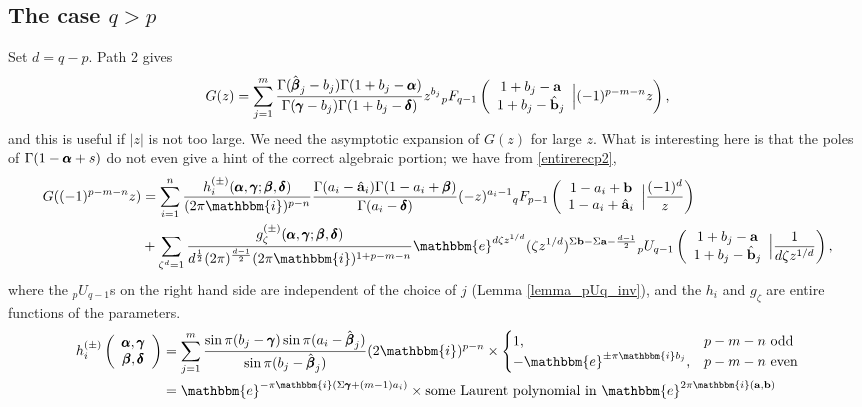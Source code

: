 \documentclass[12pt]{article}
\newcommand{\ee}[0] {\mathbbm{e}}
\newcommand{\ii}[0] {\mathbbm{i}}
\numberwithin{equation}{section}
\newcommand{\FF}[6] {{}_{#1}{#2}_{#3} \left( \begin{array}{c} #4 \\ #5 \end{array} \Big| {#6}  \right)}
\newcommand{\bfa}[0] {\mathbf{a}}
\newcommand{\bfb}[0] {\mathbf{b}}
\begin{document}
\subsection{The case $q>p$}
Set $d = q-p$. Path 2 gives
\begin{equation}
\label{eq_Gpath2}
G(z) = \sum_{j=1}^{m} \frac{\Gamma(\hat{\bfbeta}_j - b_j)\Gamma(1+b_j-\bfalpha)}{\Gamma(\bfgamma-b_j)\Gamma(1+b_j-\bfdelta)} z^{b_j}\FF{p}{F}{q-1}{1+b_j-\bfa}{1+b_j-\hat{\bfb}_j}{(-1)^{p-m-n}z}\text{,}
\end{equation}
and this is useful if $|z|$ is not too large. We need the asymptotic expansion of $G(z)$ for large $z$. What is interesting here is that the poles of $\Gamma(1-\pmb{\alpha}+s)$ do not even give a hint of the correct algebraic portion; we have from \eqref{entirerecp2},
\begin{align*}
G((-1)^{p-m-n}z) &= \sum_{i=1}^{n} \frac{h_{i}^{(\pm)}(\bfalpha, \bfgamma; \bfbeta, \bfdelta)}{(2\pi \ii)^{p-n} } \frac{\Gamma(a_i-\hat{\bfa}_i)\Gamma(1-a_i+\bfbeta)}{\Gamma(a_i-\bfdelta)} (-z)^{a_i-1}\FF{q}{F}{p-1}{1-a_i+\bfb}{1-a_i+\hat{\bfa}_i}{\frac{(-1)^{d}}{z}}\\
&+\sum_{\zeta^d=1} \frac{g_{\zeta}^{(\pm)}(\bfalpha, \bfgamma; \bfbeta, \bfdelta)}{d^{\frac{1}{2}} (2\pi)^{\frac{d-1}{2}} (2\pi \ii)^{1+p-m-n}} \ee^{d \zeta z^{1/d}}(\zeta z^{1/d})^{\Sigma \bfb - \Sigma \bfa - \frac{d-1}{2}} \FF{p}{U}{q-1}{1+b_j-\bfa}{1+b_j-\hat{\bfb}_j}{\frac{1}{d\zeta z^{1/d}}}\text{,}
\end{align*}
where the ${}_p U_{q-1}$s on the right hand side are independent of the choice of $j$ (Lemma \ref{lemma_pUq_inv}), and the $h_i$ and $g_{\zeta}$ are entire functions of the parameters.
\begin{align*}
h_{i}^{(\pm)}\left(\begin{array}{c} \bfalpha, \bfgamma \\ \bfbeta, \bfdelta \end{array}\right) &= \sum_{j=1}^{m} \frac{\sin \pi (b_j-\bfgamma) \sin \pi (a_i-\hat{\bfbeta}_j)}{\sin \pi (b_j-\hat{\bfbeta}_j)} (2 \ii)^{p-n} \times \begin{cases} 1\text{,}& p-m-n \text{ odd}\\
-\ee^{\pm \pi \ii b_j}\text{,}& p-m-n \text{ even}\end{cases}\\
&= \ee^{-\pi \ii (\Sigma \bfgamma + (m-1) a_i)} \times \text{some Laurent polynomial in } \ee^{2\pi \ii (\bfa, \bfb)}
\end{align*}
\end{document}
